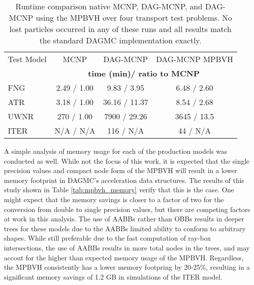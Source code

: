 \begin{table}[H]
  \small
  \begin{center}
    \begin{tabular}{lccc}

      \toprule
      Test Model & MCNP & DAG-MCNP & DAG-MCNP MPBVH \\
      & \multicolumn{3}{c}{\textbf{time (min)/ ratio to MCNP}} \\
      \hline
      FNG           & 2.49 / 1.00 &  9.83  / 3.95  & 6.48 / 2.60 \\
      ATR           & 3.18 / 1.00 &  36.16 / 11.37 & 8.54 / 2.68 \\
      UWNR          & 270  / 1.00 &  7900  / 29.26 & 3645 / 13.5 \\
      ITER          & N/A  / N/A  &  116   / N/A   & 44   / N/A  \\
      \bottomrule
    \end{tabular}
  \end{center}
  \caption{Runtime comparison native MCNP, DAG-MCNP, and DAG-MCNP using the
    MPBVH over four transport test problems. No lost particles occurred in any of
  these runs and all results match the standard DAGMC implementation exactly.}
  \label{tab:mpbvh_transport_timing_production}
\end{table}

A simple analysis of memory usage for each of the production models was
conducted as well. While not the focus of this work, it is expected that the
single precision values and compact node form of the MPBVH will result in a
lower memory footprint in DAGMC's acceleration data structures. The results of
this study shown in Table \ref{tab:mpbvh_memory} verify that this is the
case. One might expect that the memory savings is closer to a factor of two for
the conversion from double to single precision values, but there are competing
factors at work in this analysis. The use of AABBs rather than OBBs results in
deeper trees for these models due to the AABBs limited ability to conform to
arbitrary shapes. While still preferable due to the fast computation of ray-box
intersections, the use of AABBs results in more total nodes in the trees, and
may accout for the higher than expected memory usage of the MPBVH. Regardless,
the MPBVH consistently has a lower memory footpring by 20-25\%, resulting in a
significant memory savings of 1.2 GB in simulations of the ITER model.

